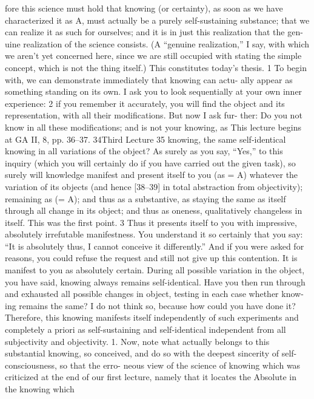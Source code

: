 fore this science must hold that knowing (or certainty), as soon as we have
characterized it as A, must actually be a purely self-sustaining substance; that we
can realize it as such for ourselves; and it is in just this realization that the gen-
uine realization of the science consists. (A “genuine realization,” I say, with
which we aren’t yet concerned here, since we are still occupied with stating the
simple concept, which is not the thing itself.) This constitutes today’s thesis. 1
To begin with, we can demonstrate immediately that knowing can actu-
ally appear as something standing on its own. I ask you to look sequentially at
your own inner experience: 2 if you remember it accurately, you will find the
object and its representation, with all their modifications. But now I ask fur-
ther: Do you not know in all these modifications; and is not your knowing, as
This lecture begins at GA II, 8, pp. 36–37.
34Third Lecture
35
knowing, the same self-identical knowing in all variations of the object? As
surely as you say, “Yes,” to this inquiry (which you will certainly do if you have
carried out the given task), so surely will knowledge manifest and present itself
to you (as = A) whatever the variation of its objects (and hence [38–39] in total
abstraction from objectivity); remaining as (= A); and thus as a substantive, as
staying the same as itself through all change in its object; and thus as oneness,
qualitatively changeless in itself. This was the first point. 3
Thus it presents itself to you with impressive, absolutely irrefutable
manifestness. You understand it so certainly that you say: “It is absolutely thus,
I cannot conceive it differently.” And if you were asked for reasons, you could
refuse the request and still not give up this contention. It is manifest to you as
absolutely certain. During all possible variation in the object, you have said,
knowing always remains self-identical. Have you then run through and
exhausted all possible changes in object, testing in each case whether know-
ing remains the same? I do not think so, because how could you have done it?
Therefore, this knowing manifests itself independently of such experiments
and completely a priori as self-sustaining and self-identical independent from
all subjectivity and objectivity.
1. Now, note what actually belongs to this substantial knowing, so conceived,
and do so with the deepest sincerity of self-consciousness, so that the erro-
neous view of the science of knowing which was criticized at the end of our
first lecture, namely that it locates the Absolute in the knowing which
